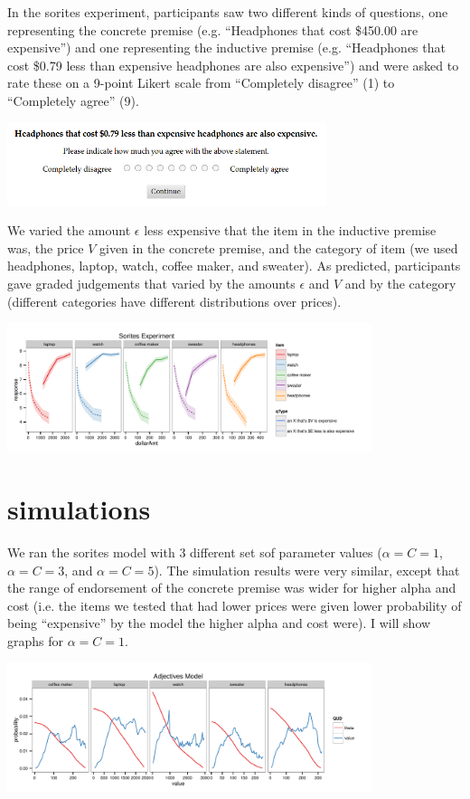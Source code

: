 \documentclass[10pt]{article}
\begin{document}
In the sorites experiment, participants saw two different kinds of questions, one representing the concrete premise (e.g. ``Headphones that cost \$450.00 are expensive'') and one representing the inductive premise (e.g. ``Headphones that cost \$0.79 less than expensive headphones are also expensive'') and were asked to rate these on a 9-point Likert scale from ``Completely disagree'' (1) to ``Completely agree'' (9).

\includegraphics[width=0.7\textwidth]{screenshot3.png}

We varied the amount $\epsilon$ less expensive that the item in the inductive premise was, the price $V$ given in the concrete premise, and the category of item (we used headphones, laptop, watch, coffee maker, and sweater). As predicted, participants gave graded judgements that varied by the amounts $\epsilon$ and $V$ and by the category (different categories have different distributions over prices).

\includegraphics[width=0.8\textwidth]{sorites-experiment.pdf}

\section{simulations}

  We ran the sorites model with 3 different set sof parameter values ($\alpha=C=1$, $\alpha=C=3$, and $\alpha=C=5$). The simulation results were very similar, except that the range of endorsement of the concrete premise was wider for higher alpha and cost (i.e. the items we tested that had lower prices were given lower probability of being ``expensive'' by the model the higher alpha and cost were). I will show graphs for $\alpha=C=1$.
  
  \includegraphics[width=0.8\textwidth]{adjective_alpha1_cost1.pdf}
  
\end{document}
